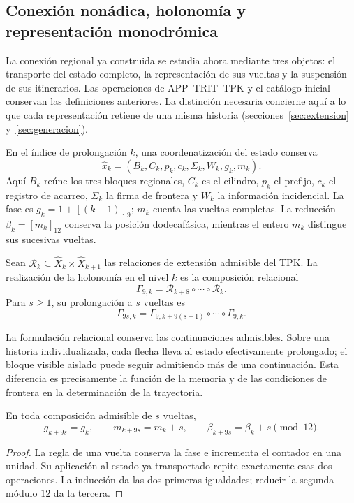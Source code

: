 \subsection{Conexión nonádica, holonomía y representación monodrómica}
\label{mono-ampl:conexion}

La conexión regional ya construida se estudia ahora mediante tres objetos:
el transporte del estado completo, la representación de sus vueltas y la
suspensión de sus itinerarios. Las operaciones de APP--TRIT--TPK y el
catálogo inicial conservan las definiciones anteriores. La distinción
necesaria concierne aquí a lo que cada representación retiene de una
misma historia (secciones~\ref{sec:extension} y~\ref{sec:generacion}).

En el índice de prolongación \(k\), una coordenatización del estado conserva
\[
 \widehat x_k=(B_k,C_k,p_k,c_k,\Sigma_k,W_k,g_k,m_k).
\]
Aquí \(B_k\) reúne los tres bloques regionales, \(C_k\) es el cilindro,
\(p_k\) el prefijo, \(c_k\) el registro de acarreo, \(\Sigma_k\) la firma
de frontera y \(W_k\) la información incidencial. La fase es
\(g_k=1+[(k-1)]_9\); \(m_k\) cuenta las vueltas completas. La reducción
\(\beta_k=[m_k]_{12}\) conserva la posición dodecafásica, mientras el
entero \(m_k\) distingue sus sucesivas vueltas.

\begin{definition}
\label{mono-ampl:def-vuelta}
Sean \(\mathcal R_k\subseteq\widehat X_k\times\widehat X_{k+1}\)
las relaciones de extensión admisible del TPK. La realización de la
holonomía en el nivel \(k\) es la composición relacional
\[
 \Gamma_{9,k}=\mathcal R_{k+8}\circ\cdots\circ\mathcal R_k.
\]
Para \(s\geq1\), su prolongación a \(s\) vueltas es
\[
 \Gamma_{9s,k}=
 \Gamma_{9,k+9(s-1)}\circ\cdots\circ\Gamma_{9,k}.
\]
\end{definition}

La formulación relacional conserva las continuaciones admisibles. Sobre
una historia individualizada, cada flecha lleva al estado efectivamente
prolongado; el bloque visible aislado puede seguir admitiendo más de una
continuación. Esta diferencia es precisamente la función de la memoria y
de las condiciones de frontera en la determinación de la trayectoria.

\begin{proposition}
\label{mono-ampl:vueltas}
En toda composición admisible de \(s\) vueltas,
\[
 g_{k+9s}=g_k,\qquad m_{k+9s}=m_k+s,\qquad
 \beta_{k+9s}=\beta_k+s\pmod{12}.
\]
\end{proposition}
\begin{proof}
La regla de una vuelta conserva la fase e incrementa el contador en una
unidad. Su aplicación al estado ya transportado repite exactamente esas
dos operaciones. La inducción da las dos primeras igualdades; reducir la
segunda módulo \(12\) da la tercera.
\end{proof}

